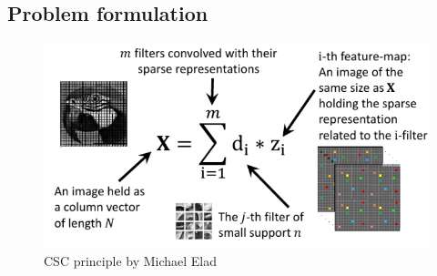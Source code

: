 \subsection{Problem formulation}
\begin{figure}[h]
 \centering
 \includegraphics[scale=0.7]{CSC_superslide.png}
 \caption{CSC principle by Michael Elad \protect\footnotemark}
 \label{fig:CSC_slide}
\end{figure}

